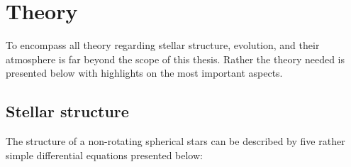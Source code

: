 \chapter{Theory}

To encompass all theory regarding stellar structure, evolution, and their atmosphere is far beyond
the scope of this thesis. Rather the theory needed is presented below with highlights on the most
important aspects.

\section{Stellar structure}

The structure of a non-rotating spherical stars can be described by five rather simple differential
equations \citep[see e.g.][]{kippenhahn} presented below:
